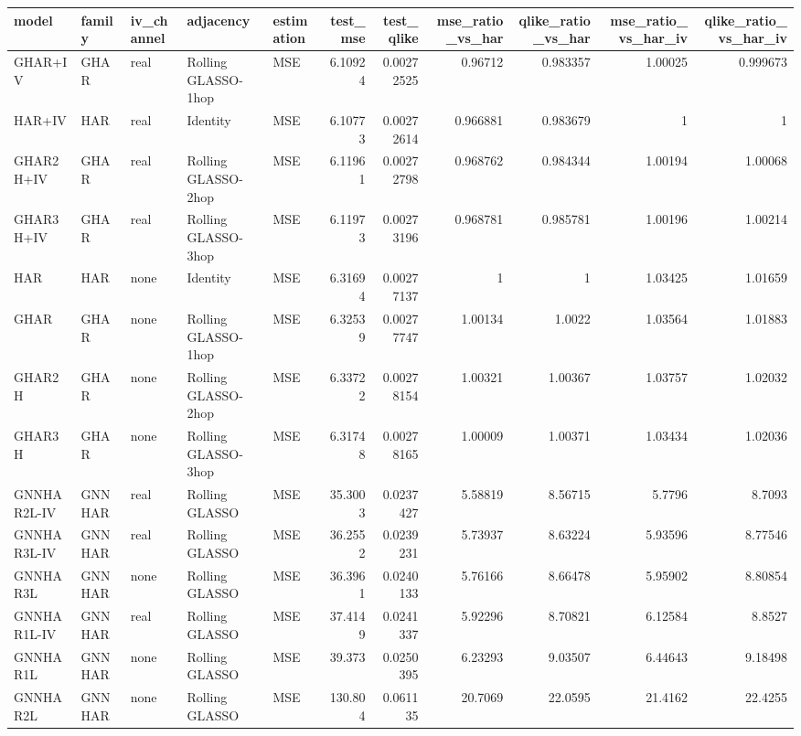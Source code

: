 \begin{tabular}{lllllrrrrrr}
\toprule
model & family & iv_channel & adjacency & estimation & test_mse & test_qlike & mse_ratio_vs_har & qlike_ratio_vs_har & mse_ratio_vs_har_iv & qlike_ratio_vs_har_iv \\
\midrule
GHAR+IV & GHAR & real & Rolling GLASSO-1hop & MSE & 6.10924 & 0.00272525 & 0.96712 & 0.983357 & 1.00025 & 0.999673 \\
HAR+IV & HAR & real & Identity & MSE & 6.10773 & 0.00272614 & 0.966881 & 0.983679 & 1 & 1 \\
GHAR2H+IV & GHAR & real & Rolling GLASSO-2hop & MSE & 6.11961 & 0.00272798 & 0.968762 & 0.984344 & 1.00194 & 1.00068 \\
GHAR3H+IV & GHAR & real & Rolling GLASSO-3hop & MSE & 6.11973 & 0.00273196 & 0.968781 & 0.985781 & 1.00196 & 1.00214 \\
HAR & HAR & none & Identity & MSE & 6.31694 & 0.00277137 & 1 & 1 & 1.03425 & 1.01659 \\
GHAR & GHAR & none & Rolling GLASSO-1hop & MSE & 6.32539 & 0.00277747 & 1.00134 & 1.0022 & 1.03564 & 1.01883 \\
GHAR2H & GHAR & none & Rolling GLASSO-2hop & MSE & 6.33722 & 0.00278154 & 1.00321 & 1.00367 & 1.03757 & 1.02032 \\
GHAR3H & GHAR & none & Rolling GLASSO-3hop & MSE & 6.31748 & 0.00278165 & 1.00009 & 1.00371 & 1.03434 & 1.02036 \\
GNNHAR2L-IV & GNNHAR & real & Rolling GLASSO & MSE & 35.3003 & 0.0237427 & 5.58819 & 8.56715 & 5.7796 & 8.7093 \\
GNNHAR3L-IV & GNNHAR & real & Rolling GLASSO & MSE & 36.2552 & 0.0239231 & 5.73937 & 8.63224 & 5.93596 & 8.77546 \\
GNNHAR3L & GNNHAR & none & Rolling GLASSO & MSE & 36.3961 & 0.0240133 & 5.76166 & 8.66478 & 5.95902 & 8.80854 \\
GNNHAR1L-IV & GNNHAR & real & Rolling GLASSO & MSE & 37.4149 & 0.0241337 & 5.92296 & 8.70821 & 6.12584 & 8.8527 \\
GNNHAR1L & GNNHAR & none & Rolling GLASSO & MSE & 39.373 & 0.0250395 & 6.23293 & 9.03507 & 6.44643 & 9.18498 \\
GNNHAR2L & GNNHAR & none & Rolling GLASSO & MSE & 130.804 & 0.061135 & 20.7069 & 22.0595 & 21.4162 & 22.4255 \\
\bottomrule
\end{tabular}
